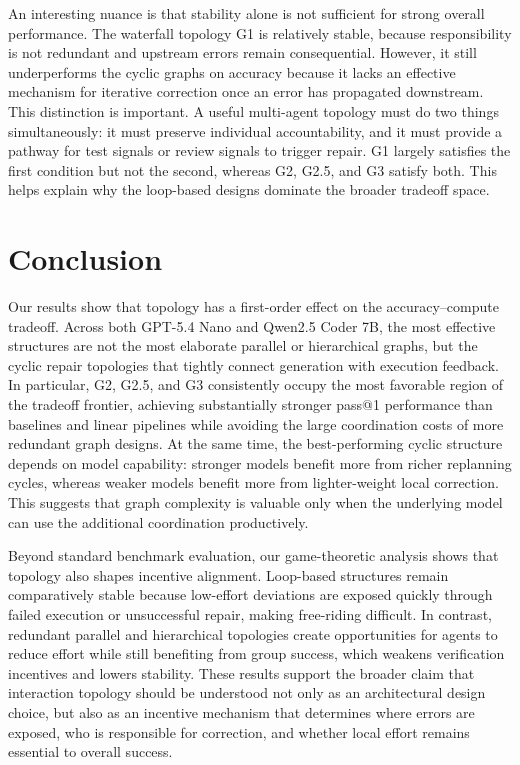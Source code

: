 \documentclass[manuscript,screen,review]{acmart}
\begin{document}
An interesting nuance is that stability alone is not sufficient for strong overall performance. The waterfall topology G1 is relatively stable, because responsibility is not redundant and upstream errors remain consequential. However, it still underperforms the cyclic graphs on accuracy because it lacks an effective mechanism for iterative correction once an error has propagated downstream. This distinction is important. A useful multi-agent topology must do two things simultaneously: it must preserve individual accountability, and it must provide a pathway for test signals or review signals to trigger repair. G1 largely satisfies the first condition but not the second, whereas G2, G2.5, and G3 satisfy both. This helps explain why the loop-based designs dominate the broader tradeoff space.

\section{Conclusion}

Our results show that topology has a first-order effect on the accuracy–compute tradeoff. Across both GPT-5.4 Nano and Qwen2.5 Coder 7B, the most effective structures are not the most elaborate parallel or hierarchical graphs, but the cyclic repair topologies that tightly connect generation with execution feedback. In particular, G2, G2.5, and G3 consistently occupy the most favorable region of the tradeoff frontier, achieving substantially stronger pass@1 performance than baselines and linear pipelines while avoiding the large coordination costs of more redundant graph designs. At the same time, the best-performing cyclic structure depends on model capability: stronger models benefit more from richer replanning cycles, whereas weaker models benefit more from lighter-weight local correction. This suggests that graph complexity is valuable only when the underlying model can use the additional coordination productively.

Beyond standard benchmark evaluation, our game-theoretic analysis shows that topology also shapes incentive alignment. Loop-based structures remain comparatively stable because low-effort deviations are exposed quickly through failed execution or unsuccessful repair, making free-riding difficult. In contrast, redundant parallel and hierarchical topologies create opportunities for agents to reduce effort while still benefiting from group success, which weakens verification incentives and lowers stability. These results support the broader claim that interaction topology should be understood not only as an architectural design choice, but also as an incentive mechanism that determines where errors are exposed, who is responsible for correction, and whether local effort remains essential to overall success.
\end{document}
